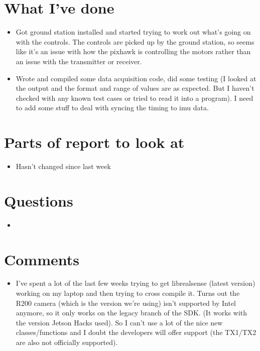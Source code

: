 \documentclass[12pt,a4paper]{article}
\begin{document}
\author{Katrina Ashton}


\pagestyle{fancy}
\fancyhf{}
\rhead{\thepage}

\section{What I've done}
\begin{itemize}
\item{Got ground station installed and started trying to work out what's going on with the controls. The controls are picked up by the ground station, so seems like it's an issue with how the pixhawk is controlling the motors rather than an issue with the transmitter or receiver.}
\item{Wrote and compiled some data acquisition code, did some testing (I looked at the output and the format and range of values are as expected. But I haven't checked with any known test cases or tried to read it into a program). I need to add some stuff to deal with syncing the timing to imu data.}
\end{itemize}

\section{Parts of report to look at}
\begin{itemize}
\item{Hasn't changed since last week}
\end{itemize}

\section{Questions}
\begin{itemize}
\item{}
\end{itemize}

\section{Comments}
\begin{itemize}
\item{I've spent a lot of the last few weeks trying to get librealsense (latest version) working on my laptop and then trying to cross compile it. Turns out the R200 camera (which is the version we're using) isn't supported by Intel anymore, so it only works on the legacy branch of the SDK. (It works with the version Jetson Hacks used). So I can't use a lot of the nice new classes/functions and I doubt the developers will offer support (the TX1/TX2 are also not officially supported).}
\end{itemize}
\end{document}
